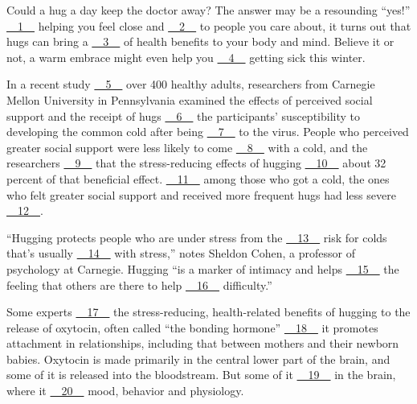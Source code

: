 Could a hug a day keep the doctor away? The answer may be a resounding ``yes!'' \uline{~~1~~} helping you feel close and \uline{~~2~~} to people you care about, it   turns out that hugs can bring a \uline{~~3~~} of health benefits to your body and mind.  Believe it or not, a warm embrace might even help you \uline{~~4~~} getting sick this winter.


In a recent study \uline{~~5~~} over 400 healthy adults, researchers from Carnegie  Mellon University in Pennsylvania examined the effects of perceived social support and the receipt of hugs \uline{~~6~~} the participants' susceptibility to  developing the common cold after being \uline{~~7~~} to the virus. People who  perceived greater social support were less likely to come \uline{~~8~~} with a cold, and  the researchers \uline{~~9~~} that the stress-reducing effects of hugging \uline{~~10~~} about  32 percent of that beneficial effect. \uline{~~11~~} among those who got a cold, the ones who felt greater social support and received more frequent hugs had less severe \uline{~~12~~}.


``Hugging protects people who are under stress from the \uline{~~13~~} risk for colds that's usually \uline{~~14~~} with stress,'' notes Sheldon Cohen, a professor of psychology at Carnegie. Hugging ``is a marker of intimacy and helps \uline{~~15~~} the  feeling that others are there to help \uline{~~16~~} difficulty.''


Some experts \uline{~~17~~} the stress-reducing, health-related benefits of hugging to the release of oxytocin, often  called ``the bonding hormone'' \uline{~~18~~} it promotes attachment in relationships, including that between mothers and their newborn babies. Oxytocin is made primarily in the central lower part of the brain, and some of it is released into the bloodstream. But some of it \uline{~~19~~} in the  brain, where it \uline{~~20~~} mood, behavior and physiology.